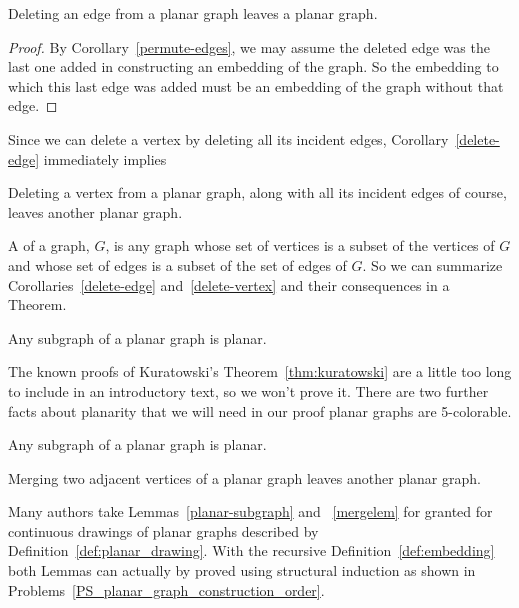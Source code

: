 \begin{editingnotes}
\begin{corollary}\label{delete-edge}
Deleting an edge from a planar graph leaves a planar graph.

\begin{proof}
  By Corollary~\ref{permute-edges}, we may assume the deleted edge was the
  last one added in constructing an embedding of the graph.  So the
  embedding to which this last edge was added must be an embedding of the
  graph without that edge.
\end{proof}

\end{corollary}

Since we can delete a vertex by deleting all its incident edges,
Corollary~\ref{delete-edge} immediately implies

\begin{corollary}%
Deleting a vertex from a planar graph, along with all its incident
edges of course, leaves another planar graph.
\end{corollary}

A  of a graph, $G$, is any graph whose set of vertices is a
subset of the vertices of $G$ and whose set of edges is a subset of the
set of edges of $G$.  So we can summarize Corollaries~\ref{delete-edge}
and~\ref{delete-vertex} and their consequences in a Theorem.

\begin{theorem}%
  Any subgraph of a planar graph is planar.
\end{theorem}
\end{editingnotes}

The known proofs of Kuratowski's Theorem~\ref{thm:kuratowski} are a little
too long to include in an introductory text, so we won't prove it.  There
are two further facts about planarity that we will need in our proof
planar graphs are 5-colorable.

\begin{lemma}\label{planar-subgraph}
  Any subgraph of a planar graph is planar.
\end{lemma}

\begin{lemma}\label{mergelem}
Merging two adjacent vertices of a planar graph leaves another planar
graph.
\end{lemma}

Many authors take Lemmas~\ref{planar-subgraph} and ~\ref{mergelem} for
granted for continuous drawings of planar graphs described by
Definition~\ref{def:planar_drawing}.  With the recursive
Definition~\ref{def:embedding} both Lemmas can actually by proved
using structural induction as shown in
Problems~\ref{PS_planar_graph_construction_order}.

